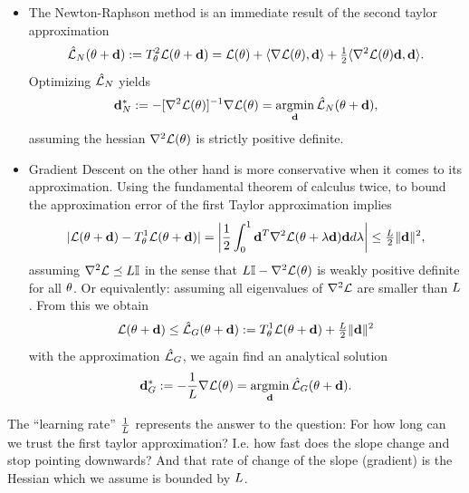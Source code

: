 \begin{itemize}
	\item 
	The Newton-Raphson method is an immediate result of the second taylor approximation
	\begin{equation*}
		\hat{\mathcal{L}}_{N}(\theta + \mathbf{d})
		:= T^2_\theta \mathcal{L}(\theta + \mathbf{d})
		= \mathcal{L}(\theta)
		+ \langle \nabla\mathcal{L}(\theta), \mathbf{d}\rangle
		+ \tfrac12 \langle \nabla^2\mathcal{L}(\theta) \mathbf{d}, \mathbf{d}\rangle.
	\end{equation*}
	Optimizing \(\hat{\mathcal{L}}_{N}\) yields
	\begin{equation*}
		\mathbf{d}^*_{N} := -[\nabla^2\mathcal{L}(\theta)]^{-1}\nabla\mathcal{L}(\theta)
		= \operatorname*{argmin}_{\mathbf{d}} \hat{\mathcal{L}}_{N}(\theta + \mathbf{d}),
	\end{equation*}
	assuming the hessian \(\nabla^2\mathcal{L}(\theta)\) is strictly positive definite.

	\item
	Gradient Descent on the other hand is more conservative when it comes to its
	approximation. Using the fundamental theorem of calculus twice, to bound
	the approximation error of the first Taylor approximation implies 
	\begin{equation}\label{eq: T1 error}
		|\mathcal{L}(\theta+\mathbf{d}) - T^1_\theta \mathcal{L}(\theta+\mathbf{d})|
		= \left| \frac 12 \int_0^1 \mathbf{d}^T \nabla^2\mathcal{L}(\theta + \lambda \mathbf{d})\mathbf{d} d\lambda\right|
		\le \tfrac{L}2 \|\mathbf{d}\|^2,
	\end{equation}
	assuming \(\nabla^2\mathcal{L} \preceq L\mathbb{I}\) in the sense that \(L\mathbb{I}
	- \nabla^2\mathcal{L}(\theta)\) is weakly positive definite for all \(\theta\). Or
	equivalently: assuming all eigenvalues of \(\nabla^2\mathcal{L}\) are smaller than
	\(L\). From this we obtain
	\begin{equation*}
		\mathcal{L}(\theta + \mathbf{d}) \le \hat{\mathcal{L}}_G(\theta+\mathbf{d})
		:= T^1_\theta \mathcal{L}(\theta+\mathbf{d}) + \tfrac{L}2\|\mathbf{d}\|^2
	\end{equation*}
	with the approximation \(\hat{\mathcal{L}}_{G}\), we again find an analytical
	solution
	\begin{equation*}
		\mathbf{d}^*_{G} := - \frac1{L} \nabla\mathcal{L}(\theta)
		= \operatorname*{argmin}_{\mathbf{d}} \hat{\mathcal{L}}_{G}(\theta + \mathbf{d}).
	\end{equation*}
\end{itemize}

The ``learning rate'' \(\frac1{L}\) represents the answer to the question:
For how long can we trust the first taylor approximation? I.e. how fast does
the slope change and stop pointing downwards? And that rate of change of the
slope (gradient) is the Hessian which we assume is bounded by \(L\).

